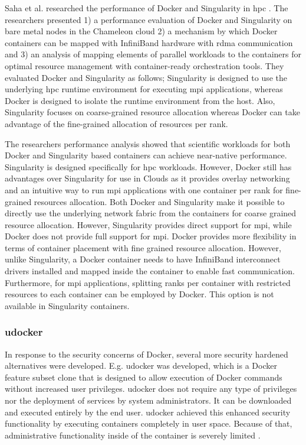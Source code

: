 \documentclass[conference]{IEEEtran}
\begin{document}
Saha et al. researched the performance of Docker and Singularity in \gls{hpc} \cite{saha2018evaluation}. The researchers presented 1) a performance evaluation of Docker and Singularity on bare metal nodes in the Chameleon cloud 2) a mechanism by which Docker containers can be mapped with InfiniBand hardware with \gls{rdma} communication and 3) an analysis of mapping elements of parallel workloads to the containers for optimal resource management with container-ready orchestration tools. They evaluated Docker and Singularity as follows; Singularity is designed to use the underlying \gls{hpc} runtime environment for executing \gls{mpi} applications, whereas Docker is designed to isolate the runtime environment from the host. Also, Singularity focuses on coarse-grained resource allocation whereas Docker can take advantage of the fine-grained allocation of resources per rank.

The researchers performance analysis showed that scientific workloads for both Docker and Singularity based containers can achieve near-native performance. Singularity is designed specifically for \gls{hpc} workloads. However, Docker still has advantages over Singularity for use in Clouds as it provides overlay networking and an intuitive way to run \gls{mpi} applications with one container per rank for fine-grained resources allocation. Both Docker and Singularity make it possible to directly use the underlying network fabric from the containers for coarse grained resource allocation. However, Singularity provides direct support for \gls{mpi}, while Docker does not provide full support for \gls{mpi}. Docker provides more flexibility in terms of container placement with fine grained resource allocation. However, unlike Singularity, a Docker container needs to have InfiniBand interconnect drivers installed and mapped inside the container to enable fast communication. Furthermore, for \gls{mpi} applications, splitting ranks per container with restricted resources to each container can be employed by Docker. This option is not available in Singularity containers.


\subsubsection{udocker}
In response to the security concerns of Docker, several more security hardened alternatives were developed. E.g. udocker was developed, which is a Docker feature subset clone that is designed to allow execution of Docker commands without increased user privileges. udocker does not require any type of privileges nor the deployment of services by system administrators. It can be downloaded and executed entirely by the end user. udocker achieved this enhanced security functionality by executing containers completely in user space. Because of that, administrative functionality inside of the container is severely limited \cite{utah-udocker}.
\end{document}
